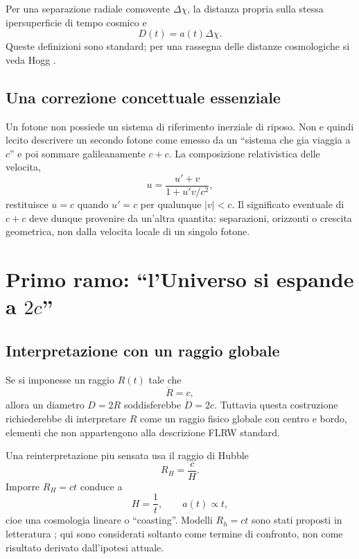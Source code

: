 \documentclass[11pt,a4paper]{article}
\begin{document}
Per una separazione radiale comovente $\Delta\chi$, la distanza propria sulla stessa ipersuperficie di tempo cosmico e
\begin{equation}
 D(t)=a(t)\Delta\chi.
\end{equation}
Queste definizioni sono standard; per una rassegna delle distanze cosmologiche si veda Hogg \cite{Hogg1999}.

\subsection{Una correzione concettuale essenziale}

Un fotone non possiede un sistema di riferimento inerziale di riposo. Non e quindi lecito descrivere un secondo fotone come emesso da un ``sistema che gia viaggia a $c$'' e poi sommare galileanamente $c+c$. La composizione relativistica delle velocita,
\begin{equation}
 u=\frac{u'+v}{1+u'v/c^2},
\end{equation}
restituisce $u=c$ quando $u'=c$ per qualunque $|v|<c$. Il significato eventuale di $c+c$ deve dunque provenire da un'altra quantita: separazioni, orizzonti o crescita geometrica, non dalla velocita locale di un singolo fotone.

\section{Primo ramo: ``l'Universo si espande a $2c$''}

\subsection{Interpretazione con un raggio globale}

Se si imponesse un raggio $R(t)$ tale che
\begin{equation}
 \dot R=c,
\end{equation}
allora un diametro $D=2R$ soddisferebbe $\dot D=2c$. Tuttavia questa costruzione richiederebbe di interpretare $R$ come un raggio fisico globale con centro e bordo, elementi che non appartengono alla descrizione FLRW standard.

Una reinterpretazione piu sensata usa il raggio di Hubble
\begin{equation}
 R_H=\frac{c}{H}.
\end{equation}
Imporre $R_H=ct$ conduce a
\begin{equation}
 H=\frac1t,\qquad a(t)\propto t,
\end{equation}
cioe una cosmologia lineare o ``coasting''. Modelli $R_h=ct$ sono stati proposti in letteratura \cite{MeliaShevchuk2011}; qui sono considerati soltanto come termine di confronto, non come risultato derivato dall'ipotesi attuale.
\end{document}

